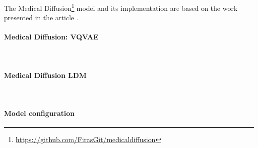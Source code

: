 The Medical Diffusion\footnote{\url{https://github.com/FirasGit/medicaldiffusion}} model and its implementation are based on the work presented in the article \cite{https://doi.org/10.48550/arxiv.2211.03364}. 

\paragraph{Medical Diffusion: VQVAE}\mbox{}\\


\paragraph{Medical Diffusion LDM}\mbox{}\\
\paragraph{Model configuration}


